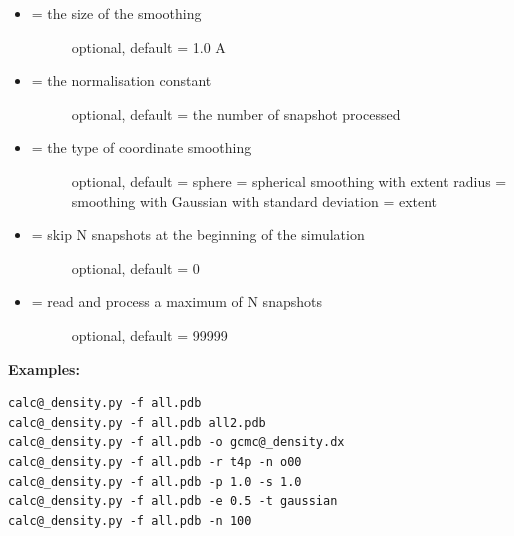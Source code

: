 \documentclass[letterpaper,10pt,english]{manual}
\begin{document}
\begin{itemize}
\begin{description}
\end{description}

\item {} \begin{description}
\item[{ = the size of the smoothing}] \leavevmode
optional, default =  1.0 A

\end{description}

\item {} \begin{description}
\item[{ = the normalisation constant}] \leavevmode
optional, default = the number of snapshot processed

\end{description}

\item {} \begin{description}
\item[{ = the type of coordinate smoothing}] \leavevmode
optional, default = sphere
 = spherical smoothing with extent radius
 = smoothing with Gaussian with standard deviation = extent

\end{description}

\item {} \begin{description}
\item[{ = skip N snapshots at the beginning of the simulation}] \leavevmode
optional, default = 0

\end{description}

\item {} \begin{description}
\item[{ = read and process a maximum of N snapshots}] \leavevmode
optional, default = 99999

\end{description}

\end{itemize}

\textbf{Examples:}

\begin{Verbatim}[commandchars=@\[\]]
calc@_density.py -f all.pdb
calc@_density.py -f all.pdb all2.pdb
calc@_density.py -f all.pdb -o gcmc@_density.dx
calc@_density.py -f all.pdb -r t4p -n o00
calc@_density.py -f all.pdb -p 1.0 -s 1.0
calc@_density.py -f all.pdb -e 0.5 -t gaussian
calc@_density.py -f all.pdb -n 100
\end{Verbatim}
\end{document}
